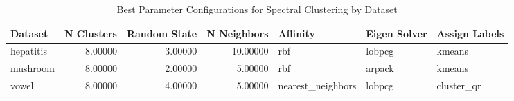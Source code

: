 \begin{table*}[ht!]
\caption{Best Parameter Configurations for Spectral Clustering by Dataset}
\label{tab:best_configs_spectral_clustering_config}
\begin{tabular}{lrrrlll}
Dataset & N Clusters & Random State & N Neighbors & Affinity & Eigen Solver & Assign Labels \\\midrule

hepatitis & 8.00000 & 3.00000 & 10.00000 & rbf & lobpcg & kmeans \\
mushroom & 8.00000 & 2.00000 & 5.00000 & rbf & arpack & kmeans \\
vowel & 8.00000 & 4.00000 & 5.00000 & nearest\_neighbors & lobpcg & cluster\_qr \\
\end{tabular}
\end{table*}
